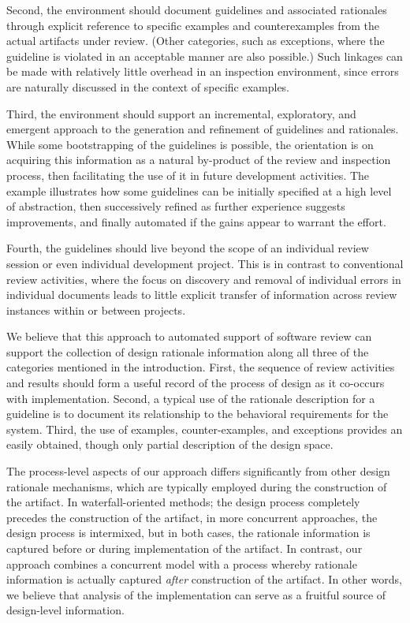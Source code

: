 Second, the environment should document guidelines and associated
rationales through explicit reference to specific examples and
counterexamples from the actual artifacts under review. (Other
categories, such as exceptions, where the guideline is violated in an
acceptable manner are also possible.)  Such linkages can be made with
relatively little overhead in an inspection environment, since errors
are naturally discussed in the context of specific examples.

Third, the environment should support an incremental, exploratory, and
emergent approach to the generation and refinement of guidelines and
rationales. While some bootstrapping of the guidelines is possible,
the orientation is on acquiring this information as a natural
by-product of the review and inspection process, then facilitating the
use of it in future development activities. The example illustrates
how some guidelines can be initially specified at a high level of
abstraction, then successively refined as further experience suggests
improvements, and finally automated if the gains appear to warrant the
effort.

Fourth, the guidelines should live beyond the scope of an
individual review session or even individual development project. This
is in contrast to conventional review activities, where the focus on 
discovery and removal of individual errors in individual documents leads
to little explicit transfer of information across review instances 
within or between projects. 

We believe that this approach to automated support of software review
can support the collection of design rationale information along all
three of the categories mentioned in the introduction. 
 First, the
sequence of review activities and results should form a useful record
of the process of design as it co-occurs with implementation.  Second,
a typical use of the rationale description for a guideline is to
document its relationship to the behavioral requirements for the
system. Third, the use of examples, counter-examples, and exceptions
provides an easily obtained, though only partial description of the
design space.

The process-level aspects of our approach differs significantly from
other design rationale mechanisms, which are typically employed during
the construction of the artifact.  In waterfall-oriented methods; the
design process completely precedes the construction of the artifact,
in more concurrent approaches, the design process is intermixed, but
in both cases, the rationale information is captured before or during
implementation of the artifact.  In contrast, our approach combines a
concurrent model with a process whereby rationale information is
actually captured {\em after} construction of the artifact.  In other
words, we believe that analysis of the implementation can serve as
a fruitful source of design-level information.

